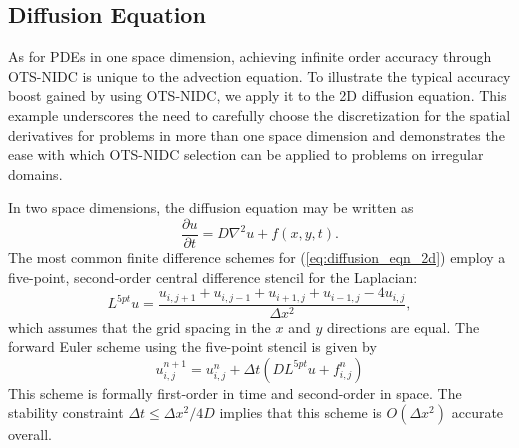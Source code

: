\documentclass[fleqn,12pt,twoside]{article}
\newcommand{\beq}{\begin{equation}}
\newcommand{\eeq}{\end{equation}}
\def\pt{\partial t}
\def\dt{\Delta t}
\def\dx{\Delta x}
\begin{document}
\subsection{Diffusion Equation \label{sec:diffusion_eqn_2d}}
As for PDEs in one space dimension, achieving infinite order accuracy 
through OTS-NIDC is unique to the advection equation.
To illustrate the typical accuracy boost gained by using OTS-NIDC,
we apply it to the 2D diffusion equation.  This example underscores 
the need to carefully choose the discretization for the spatial derivatives 
for problems in more than one space dimension and demonstrates the ease with 
which OTS-NIDC selection can be applied to problems on irregular domains.

In two space dimensions, the diffusion equation may be written as
\beq
  \frac{\partial u}{\pt} = D \nabla^2 u + f(x,y,t).
  \label{eq:diffusion_eqn_2d}
\eeq
The most common finite difference schemes for (\ref{eq:diffusion_eqn_2d}) 
employ a five-point, second-order central difference stencil for the 
Laplacian:
\beq
  L^{5pt} u = \frac{u_{i,j+1} + u_{i,j-1}
                   +u_{i+1,j} + u_{i-1,j} - 4u_{i,j}}{\dx^2},
  \label{eq:laplacian_2d_5pt_stencil}
\eeq
which assumes that the grid spacing in the $x$ and $y$ directions are
equal.  The forward Euler scheme using the five-point stencil is given by
\beq
  u^{n+1}_{i,j} = u^{n}_{i,j}
  + \dt \left( D L^{5pt} u + f_{i,j}^n \right)
  \label{eq:diffusion_eqn_2d_5pt_scheme}
\eeq
This scheme is formally first-order in time and second-order in space.  
The stability constraint $\dt \le \dx^2/4D$ implies that this scheme is
$O(\dx^2)$ accurate overall.
\end{document}
